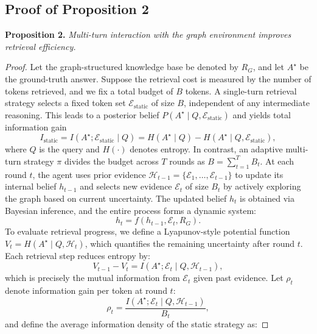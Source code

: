\documentclass{article}
\theoremstyle{plain}
\theoremstyle{definition}
\theoremstyle{remark}
\begin{document}
\subsection{Proof of Proposition 2}
\label{proof2}
\textbf{Proposition 2.}
\textit{Multi-turn interaction with the graph environment improves retrieval efficiency.}\vspace{-2mm}
\begin{proof}
Let the graph-structured knowledge base be denoted by $R_G$, and let $A^\star$ be the ground-truth answer. Suppose the retrieval cost is measured by the number of tokens retrieved, and we fix a total budget of $B$ tokens. A single-turn retrieval strategy selects a fixed token set $\mathcal E_{\mathrm{static}}$ of size $B$, independent of any intermediate reasoning. This leads to a posterior belief $P(A^\star \mid Q, \mathcal E_{\mathrm{static}})$ and yields total information gain
\begin{equation}
I_{\mathrm{static}} = I(A^\star; \mathcal E_{\mathrm{static}} \mid Q) = H(A^\star \mid Q) - H(A^\star \mid Q, \mathcal E_{\mathrm{static}}),
\end{equation}
where $Q$ is the query and $H(\cdot)$ denotes entropy.
In contrast, an adaptive multi-turn strategy $\pi$ divides the budget across $T$ rounds as $B = \sum_{t=1}^T B_t$. At each round $t$, the agent uses prior evidence $\mathcal H_{t-1} = \{\mathcal E_1, \dots, \mathcal E_{t-1}\}$ to update its internal belief $h_{t-1}$ and selects new evidence $\mathcal E_t$ of size $B_t$ by actively exploring the graph based on current uncertainty. The updated belief $h_t$ is obtained via Bayesian inference, and the entire process forms a dynamic system:
\begin{equation}
h_t = f(h_{t-1}, \mathcal E_t, R_G).
\end{equation}
To evaluate retrieval progress, we define a Lyapunov-style potential function $V_t = H(A^\star \mid Q, \mathcal H_t)$, which quantifies the remaining uncertainty after round $t$. Each retrieval step reduces entropy by:
\begin{equation}
V_{t-1} - V_t = I(A^\star; \mathcal E_t \mid Q, \mathcal H_{t-1}),
\end{equation}
which is precisely the mutual information from $\mathcal E_t$ given past evidence.
Let $\rho_t$ denote information gain per token at round $t$:
\begin{equation}
\rho_t = \frac{I(A^\star; \mathcal E_t \mid Q, \mathcal H_{t-1})}{B_t},
\end{equation}
and define the average information density of the static strategy as:

\end{proof}
\end{document}
